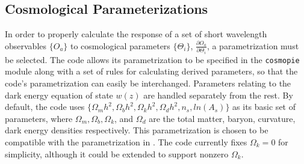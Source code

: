 \documentclass[a4paper,11pt]{article}
\begin{document}
\subsection{Cosmological Parameterizations}
In order to properly calculate the response of a set of short wavelength observables $\{O_a\}$ to cosmological parameters $\{\Theta_i\}$, $\frac{\partial O_a}{\partial \Theta_i}$, a parametrization must be selected. The code allows its parametrization to be specified in the \texttt{cosmopie} module along with a set of rules for calculating derived parameters, so that the code's parametrization can easily be interchanged. Parameters relating to the dark energy equation of state $w(z)$ are handled separately from the rest. By default, the code uses $\{\Omega_m h^2,\Omega_b h^2,\Omega_k h^2, \Omega_d h^2, n_s,ln(A_s)\}$ as its basic set of parameters, where $\Omega_m,\Omega_b,\Omega_k$, and $\Omega_d$ are the total matter, baryon, curvature, dark energy densities respectively. This parametrization is chosen to be compatible with the parametrization in \cite{jdem_fom}. The code currently fixes $\Omega_k=0$ for simplicity, although it could be extended to support nonzero $\Omega_k$. 
\end{document}
